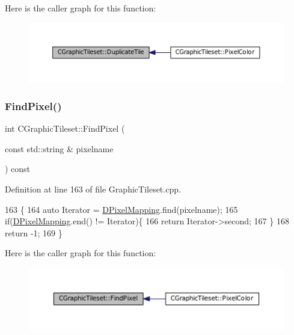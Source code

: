 Here is the caller graph for this function\+:
\nopagebreak
\begin{figure}[H]
\begin{center}
\leavevmode
\includegraphics[width=350pt]{classCGraphicTileset_a78db70086b4cd1085fd3b5d0d0dc5fdd_icgraph}
\end{center}
\end{figure}
\hypertarget{classCGraphicTileset_a87047c22039dc6137b790b7609c627a8}{}\label{classCGraphicTileset_a87047c22039dc6137b790b7609c627a8} 
\subsubsection{\texorpdfstring{Find\+Pixel()}{FindPixel()}}
{\footnotesize\ttfamily int C\+Graphic\+Tileset\+::\+Find\+Pixel (\begin{DoxyParamCaption}\item[{const std\+::string \&}]{pixelname }\end{DoxyParamCaption}) const}



Definition at line 163 of file Graphic\+Tileset.\+cpp.


\begin{DoxyCode}
163                                                               \{
164     \textcolor{keyword}{auto} Iterator = \hyperlink{classCGraphicTileset_a650c021d8ea1724a4c9564600df0da05}{DPixelMapping}.find(pixelname);
165     \textcolor{keywordflow}{if}(\hyperlink{classCGraphicTileset_a650c021d8ea1724a4c9564600df0da05}{DPixelMapping}.end() != Iterator)\{
166         \textcolor{keywordflow}{return} Iterator->second;
167     \}
168     \textcolor{keywordflow}{return} -1;
169 \}
\end{DoxyCode}
Here is the caller graph for this function\+:
\nopagebreak
\begin{figure}[H]
\begin{center}
\leavevmode
\includegraphics[width=350pt]{classCGraphicTileset_a87047c22039dc6137b790b7609c627a8_icgraph}
\end{center}
\end{figure}
\hypertarget{classCGraphicTileset_ab8f2c2b2f2095b17d53c3dc475d5685c}{}\label{classCGraphicTileset_ab8f2c2b2f2095b17d53c3dc475d5685c} 
